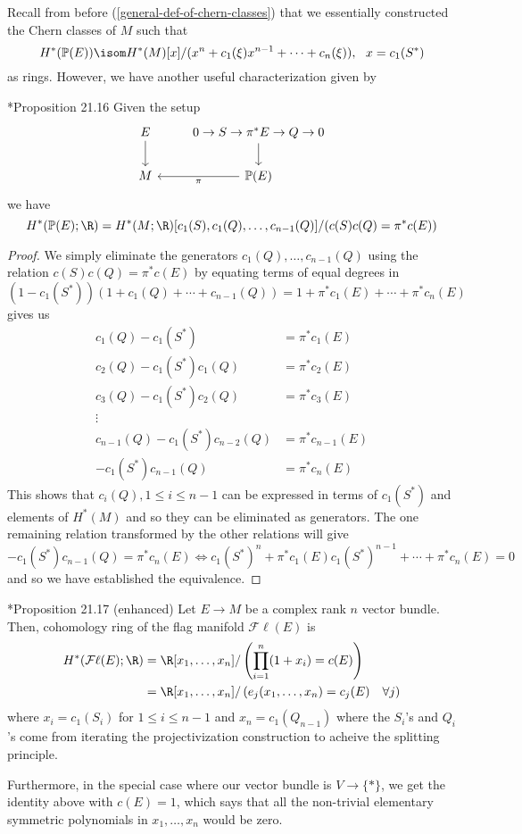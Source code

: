 \documentclass[11pt,leqno,oneside]{amsbook}
\renewcommand{\P}{\mathbb{P}}
\numberwithin{thm}{section}
\newcommand{\Fl}{\mathcal{F\ell}}
\begin{document}
Recall from before (\ref{general-def-of-chern-classes}) that we
essentially constructed the Chern classes 
of \(M\) such that \[
  H^*(\P(E)) \isom H^*(M)[x]/(x^n + c_1(\xi) x^{n-1} + \cdots
  + c_n(\xi)), \ \ x = c_1(S^*)
\]
as rings. However, we have another useful characterization given by
\begin{prop}
  \cite{bott-tu}*{Proposition 21.16} Given the setup \[
    \begin{tikzcd}
      E \ar[d] & 0 \to S \to \pi^*E \to Q \to 0 \ar[d]\\
      M & \ar[l, "\pi"] \P(E)
    \end{tikzcd}
  \]
  we have
  \[
    H^*(\P(E);\R) = H^*(M;\R)[c_1(S),c_1(Q), \ldots,c_{n-1}(Q)]/(c(S)c(Q) = \pi^* c(E))
  \]  
\end{prop}
\begin{proof}
  We simply eliminate the generators \(c_1(Q), \ldots, c_{n-1}(Q)\)
  using the relation \(c(S)c(Q) = \pi^*c(E)\) by equating terms of
  equal degrees in \[
    (1-c_1(S^*))(1+c_1(Q) + \cdots + c_{n-1}(Q)) = 1+\pi^*c_1(E) +
    \cdots + \pi^* c_{n}(E)
  \]
  gives us
  \begin{align*}
      c_1(Q) - c_1(S^*) & = \pi^*c_1(E) \\
      c_2(Q) - c_1(S^*)c_1(Q) & = \pi^*c_2(E)\\
      c_3(Q) - c_1(S^*)c_2(Q) & = \pi^*c_3(E)\\
       \vdots \\
       c_{n-1}(Q) - c_1(S^*) c_{n-2}(Q) & = \pi^* c_{n-1}(E)\\
       -c_1(S^*) c_{n-1}(Q) & = \pi^* c_{n}(E)
    \end{align*}
  This shows that \(c_i(Q), 1 \leq i \leq n-1\) can be
  expressed in terms 
  of \(c_1(S^*)\) and elements of \(H^*(M)\) and so they can be
  eliminated as generators. The one remaining relation transformed by
  the other relations will give \[
    - c_1(S^*) c_{n-1}(Q) = \pi^* c_n(E) \iff c_1(S^*)^n + \pi^* c_1(E)
    c_1(S^*)^{n-1} + \cdots + \pi^* c_n(E) = 0
  \]
  and so we have established the equivalence.
\end{proof}
\begin{prop}\label{cohomology-of-flag-manifold}
  \cite{bott-tu}*{Proposition 21.17 (enhanced)} Let \(E \to M\) be a
  complex rank \(n\) vector bundle. Then, cohomology ring of the flag
  manifold \(\Fl(E)\) is
  \begin{align*}
    H^*(\Fl(E);\R)
    & = \R[x_1, \ldots, x_n] / \left( \prod_{i=1}^n (1+x_i) = c(E)
      \right)\\
    & = \R[x_1, \ldots, x_n] / \left( e_j(x_1, \ldots, x_n) = c_j(E)
      \ \ \ \forall j \right)
  \end{align*}
  where \(x_i = c_1(S_i)\) for \(1 \leq i \leq n-1\) and \(x_n =
  c_1(Q_{n-1})\) where the \(S_i\)'s and \(Q_i\)'s come from iterating the
  projectivization construction to acheive the splitting
  principle.

  Furthermore, in the special case where our vector 
  bundle is \(V \to \{*\}\), 
  we get the identity above with \(c(E) = 1\), which says that all the
  non-trivial elementary symmetric polynomials in \(x_1, \ldots, x_n\)
  would be zero.
\end{prop}
\end{document}
